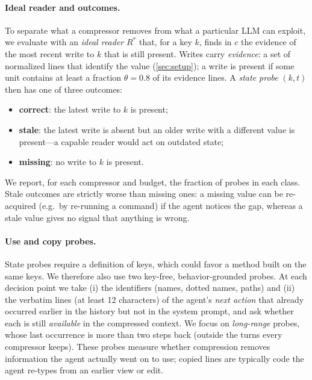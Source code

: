 \paragraph{Ideal reader and outcomes.} To separate what a compressor removes
from what a particular LLM can exploit, we evaluate with an \emph{ideal reader}
$R^\ast$ that, for a key $k$, finds in $c$ the evidence of the most recent write
to $k$ that is still present. Writes carry \emph{evidence}: a set of normalized
lines that identify the value (\cref{sec:setup}); a write is present if some
unit contains at least a fraction $\theta=0.8$ of its evidence lines. A
\emph{state probe} $(k,t)$ then has one of three outcomes:
\begin{itemize}[leftmargin=*,itemsep=1pt,topsep=2pt]
  \item \textbf{correct}: the latest write to $k$ is present;
  \item \textbf{stale}: the latest write is absent but an older write with a
  different value is present---a capable reader would act on outdated state;
  \item \textbf{missing}: no write to $k$ is present.
\end{itemize}
We report, for each compressor and budget, the fraction of probes in each class.
Stale outcomes are strictly worse than missing ones: a missing value can be
re-acquired (e.g.\ by re-running a command) if the agent notices the gap,
whereas a stale value gives no signal that anything is wrong.

\paragraph{Use and copy probes.} State probes require a definition of keys,
which could favor a method built on the same keys. We therefore also use two
key-free, behavior-grounded probes. At each decision point we take (i) the
identifiers (names, dotted names, paths) and (ii) the verbatim lines (at least 12
characters) of the agent's \emph{next action} that already occurred earlier in
the history but not in the system prompt, and ask whether each is still
\emph{available} in the compressed context. We focus on \emph{long-range} probes,
whose last occurrence is more than two steps back (outside the turns every
compressor keeps). These probes measure whether compression removes information
the agent actually went on to use; copied lines are typically code the agent
re-types from an earlier view or edit.


